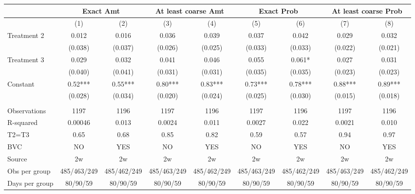 \begin{tabular}{lcccccccc}
\toprule
      & \multicolumn{2}{c}{Exact Amt} & \multicolumn{2}{c}{At least coarse Amt} & \multicolumn{2}{c}{Exact Prob} & \multicolumn{2}{c}{At least coarse Prob} \\
\midrule
      & (1)   & (2)   & (3)   & (4)   & (5)   & (6)   & (7)   & (8) \\
\midrule
Treatment 2 & 0.012 & 0.016 & 0.036 & 0.039 & 0.037 & 0.042 & 0.029 & 0.032 \\
      & (0.038) & (0.037) & (0.026) & (0.025) & (0.033) & (0.033) & (0.022) & (0.021) \\
Treatment 3 & 0.029 & 0.032 & 0.041 & 0.046 & 0.055 & 0.061* & 0.027 & 0.031 \\
      & (0.040) & (0.041) & (0.031) & (0.031) & (0.035) & (0.035) & (0.023) & (0.023) \\
Constant & 0.52*** & 0.55*** & 0.80*** & 0.83*** & 0.73*** & 0.78*** & 0.88*** & 0.89*** \\
      & (0.028) & (0.034) & (0.020) & (0.024) & (0.025) & (0.030) & (0.015) & (0.018) \\
      &       &       &       &       &       &       &       &  \\
\midrule
Observations & 1197  & 1196  & 1197  & 1196  & 1197  & 1196  & 1197  & 1196 \\
R-squared & 0.00046 & 0.013 & 0.0024 & 0.011 & 0.0027 & 0.022 & 0.0021 & 0.010 \\
T2=T3 & 0.65  & 0.68  & 0.85  & 0.82  & 0.59  & 0.57  & 0.94  & 0.97 \\
BVC   & NO    & YES   & NO    & YES   & NO    & YES   & NO    & YES \\
Source & 2w    & 2w    & 2w    & 2w    & 2w    & 2w    & 2w    & 2w \\
Obs per group & 485/463/249 & 485/462/249 & 485/463/249 & 485/462/249 & 485/463/249 & 485/462/249 & 485/463/249 & 485/462/249 \\
Days per group & 80/90/59 & 80/90/59 & 80/90/59 & 80/90/59 & 80/90/59 & 80/90/59 & 80/90/59 & 80/90/59 \\
\bottomrule
\bottomrule
\end{tabular}%
